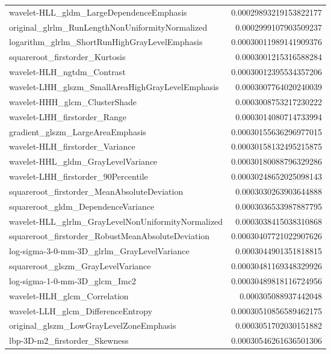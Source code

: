 {\begin{xltabular}[H]{\textwidth}{X r}
        wavelet-HLL\_gldm\_LargeDependenceEmphasis & 0.00029893219153822177 \\
        original\_glrlm\_RunLengthNonUniformityNormalized & 0.0002999107903509237 \\
        logarithm\_glrlm\_ShortRunHighGrayLevelEmphasis & 0.00030011989141909376 \\
        squareroot\_firstorder\_Kurtosis & 0.0003001215316588284 \\
        wavelet-HLH\_ngtdm\_Contrast & 0.00030012395534357206 \\
        wavelet-LHH\_glszm\_SmallAreaHighGrayLevelEmphasis & 0.0003007764020240039 \\
        wavelet-HHH\_glcm\_ClusterShade & 0.0003008753217230222 \\
        wavelet-LHH\_firstorder\_Range & 0.0003014080714733994 \\
        gradient\_glszm\_LargeAreaEmphasis & 0.00030155636296977015 \\
        wavelet-HLH\_firstorder\_Variance & 0.00030158132495215875 \\
        wavelet-HHL\_gldm\_GrayLevelVariance & 0.00030180088796329286 \\
        wavelet-LHH\_firstorder\_90Percentile & 0.00030248652025098143 \\
        squareroot\_firstorder\_MeanAbsoluteDeviation & 0.0003030263903644888 \\
        squareroot\_gldm\_DependenceVariance & 0.0003036533987887795 \\
        wavelet-HLL\_glrlm\_GrayLevelNonUniformityNormalized & 0.0003038415038310868 \\
        squareroot\_firstorder\_RobustMeanAbsoluteDeviation & 0.00030407721022907626 \\
        log-sigma-3-0-mm-3D\_glrlm\_GrayLevelVariance & 0.0003044901351818815 \\
        squareroot\_glszm\_GrayLevelVariance & 0.00030481169348329926 \\
        log-sigma-1-0-mm-3D\_glcm\_Imc2 & 0.00030489818116724956 \\
        wavelet-HLH\_glcm\_Correlation & 0.000305088937442048 \\
        wavelet-LLH\_glcm\_DifferenceEntropy & 0.00030510856589462175 \\
        original\_glszm\_LowGrayLevelZoneEmphasis & 0.0003051702030151882 \\
        lbp-3D-m2\_firstorder\_Skewness & 0.00030546261636501306 \\

\end{xltabular}}
